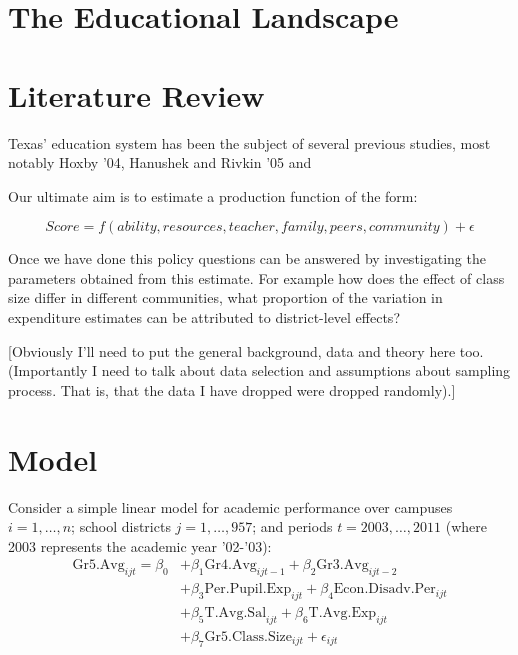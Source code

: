 \documentclass[11pt]{article}
\begin{document}
\section{The Educational Landscape}
\label{s:next}




\section{Literature Review}
\label{s:next}

Texas' education system has been the subject of several previous studies, most notably Hoxby '04, Hanushek and Rivkin '05 and 



Our ultimate aim is to estimate a production function of the form:

$$Score = f(ability,resources,teacher,family,peers,community) + \epsilon$$

Once we have done this policy questions can be answered by investigating the parameters obtained from this estimate. For example how does the effect of class size differ in different communities, what proportion of the variation in expenditure estimates can be attributed to district-level effects?

[Obviously I'll need to put the general background, data and theory here too. (Importantly I need to talk about data selection and assumptions about sampling process. That is, that the data I have dropped were dropped randomly).]

\section{Model}
\label{s:next}


Consider a simple linear model for academic performance over campuses $i=1,\ldots,n$; school districts $j=1,\ldots,957$; and periods $t=2003,\ldots,2011$ (where 2003 represents the academic year '02-'03):
\begin{align*}
\mathrm{Gr5.Avg}_{ijt} = \beta_{0} 
    &+ \beta_{1}  \mathrm{Gr4.Avg}_{ijt-1} 
    + \beta_{2}  \mathrm{Gr3.Avg}_{ijt-2}    \\
    &+ \beta_{3}  \mathrm{Per.Pupil.Exp}_{ijt} 
    + \beta_{4}  \mathrm{Econ.Disadv.Per}_{ijt} \\
    &+ \beta_{5}  \mathrm{T.Avg.Sal}_{ijt}   
    + \beta_{6}  \mathrm{T.Avg.Exp}_{ijt}  \\
    &+ \beta_{7}  \mathrm{Gr5.Class.Size}_{ijt} + \epsilon_{ijt}
\end{align*}
\end{document}
